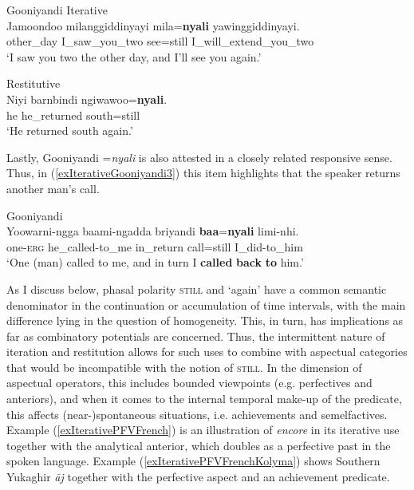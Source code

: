\begin{exe}
	\ex \label{exIterativeGooniyandi}
	\begin{xlist}
		\exi{}Gooniyandi
		\ex Iterative\label{exIterativeGooniyandi1}\\
		\gll Jamoondoo milanggiddinyayi mila=\textbf{nyali} yawinggiddinyayi.\\
		other\_day I\_saw\_you\_two see=still I\_will\_extend\_you\_two\\
		\glt \lq I saw you two the other day, and I'll see you again.\rq{}
	
		\ex Restitutive\label{exIterativeGooniyandi2}\\
		\gll Niyi barnbindi ngiwawoo=\textbf{nyali}.\\
		he he\_returned south=still\\
		\glt \lq He returned south again.\rq{ }\parencite[460]{McGregor1990}
	\end{xlist}
\end{exe}

Lastly, Gooniyandi \mbox{=\textit{nyali}} is also attested in a closely related responsive sense. Thus, in (\ref{exIterativeGooniyandi3}) this item highlights that the speaker returns another man's call.

\begin{exe}
	\ex Gooniyandi\label{exIterativeGooniyandi3}\\
	\gll Yoowarni-ngga baami-ngadda briyandi \textbf{baa}=\textbf{nyali} limi-nhi.\\
	one-\textsc{erg} he\_called-to\_me in\_return call=still I\_did-to\_him\\
	\glt \lq One (man) called to me, and in turn I \textbf{called} \textbf{back} \textbf{to} him.'
	\\\parencite[461]{McGregor1990}
\end{exe}

As I discuss below, phasal polarity \textsc{still} and \lq again\rq{ }have a common semantic denominator in the continuation or accumulation of time intervals, with the main difference lying in the question of homogeneity. This, in turn, has implications as far as combinatory potentials are concerned. Thus, the intermittent nature of iteration and restitution allows for such uses to combine with aspectual categories that would be incompatible with the notion of \textsc{still}. In the dimension of aspectual operators, this includes bounded viewpoints (e.g. perfectives and anteriors), and when it comes to the internal temporal make-up of the predicate, this affects (near-)spontaneous situations, i.e. achievements and semelfactives. Example (\ref{exIterativePFVFrench}) is an illustration of  \textit{encore} in its iterative use together with the analytical anterior, which doubles as a perfective past in the spoken language. Example (\ref{exIterativePFVFrenchKolyma}) shows Southern Yukaghir \textit{āj} together with the perfective aspect and an achievement predicate.

